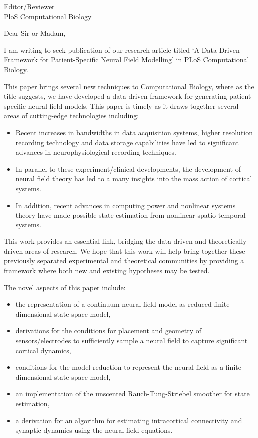 \documentclass[a4paper,10pt]{letter}
\begin{document}
\begin{letter}{Editor/Reviewer \\ PloS Computational Biology}

\opening{Dear Sir or Madam,}




I am writing to seek publication of our research article titled `A Data Driven Framework for Patient-Specific Neural Field Modelling' in PLoS Computational Biology.

This paper brings several new techniques to Computational Biology, where as the title suggests, we have developed a data-driven framework for generating patient-specific neural field models. This paper is timely as it draws together several areas of cutting-edge technologies including:
\begin{itemize}
	\item Recent increases in bandwidths in data acquisition systems, higher resolution recording technology and data storage capabilities have led to significant advances in neurophysiological recording techniques. 
	\item In parallel to these experiment/clinical developments, the development of neural field theory has led to a many insights into the mass action of cortical systems. 
	\item In addition, recent advances in computing power and nonlinear systems theory have made possible state estimation from nonlinear spatio-temporal systems.
\end{itemize}

This work provides an essential link, bridging the data driven and theoretically driven areas of research. We hope that this work will help bring together these previously separated experimental and theoretical communities by providing a framework where both new and existing hypotheses may be tested.

The novel aspects of this paper include:
\begin{itemize}
	\item the representation of a continuum neural field model as reduced finite-dimensional state-space model,
	\item derivations for the conditions for placement and geometry of sensors/electrodes to sufficiently sample a neural field to capture significant cortical dynamics,
	\item conditions for the model reduction to represent the neural field as a finite-dimensional state-space model,
	\item an implementation of the unscented Rauch-Tung-Striebel smoother for state estimation,
	\item a derivation for an algorithm for estimating intracortical connectivity and synaptic dynamics using the neural field equations.
\end{itemize}


\end{letter}
\end{document}
